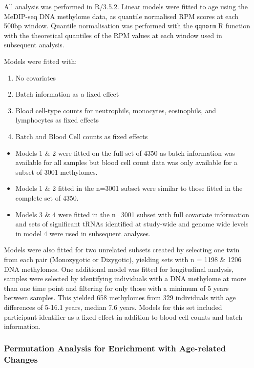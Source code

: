 \documentclass[
]{book}
\providecommand{\tightlist}{%
  \setlength{\itemsep}{0pt}\setlength{\parskip}{0pt}}
\begin{document}
All analysis was performed in R/3.5.2.
Linear models were fitted to age using the MeDIP-seq DNA methylome data, as quantile normalised RPM scores at each 500bp window.
Quantile normalisation was performed with the \texttt{qqnorm} R function with the theoretical quantiles of the RPM values at each window used in subsequent analysis.

Models were fitted with:

\begin{enumerate}
\def\labelenumi{\arabic{enumi}.}
\tightlist
\item
  No covariates
\item
  Batch information as a fixed effect
\item
  Blood cell-type counts for neutrophils, monocytes, eosinophils, and lymphocytes as fixed effects
\item
  Batch and Blood Cell counts as fixed effects
\end{enumerate}

\begin{itemize}
\tightlist
\item
  Models 1 \& 2 were fitted on the full set of 4350 as batch information was available for all samples but blood cell count data was only available for a subset of 3001 methylomes.
\item
  Models 1 \& 2 fitted in the n=3001 subset were similar to those fitted in the complete set of 4350.
\item
  Models 3 \& 4 were fitted in the n=3001 subset with full covariate information and sets of significant tRNAs identified at study-wide and genome wide levels in model 4 were used in subsequent analyses.
\end{itemize}

Models were also fitted for two unrelated subsets created by selecting one twin from each pair (Monozygotic or Dizygotic), yielding sets with n = 1198 \& 1206 DNA methylomes.
One additional model was fitted for longitudinal analysis, samples were selected by identifying individuals with a DNA methylome at more than one time point and filtering for only those with a minimum of 5 years between samples.
This yielded 658 methylomes from 329 individuals with age differences of 5-16.1 years, median 7.6 years.
Models for this set included participant identifier as a fixed effect in addition to blood cell counts and batch information.

\hypertarget{AgeErichmentPermutation}{%
\subsubsection{Permutation Analysis for Enrichment with Age-related Changes}\label{AgeErichmentPermutation}}
\end{document}
